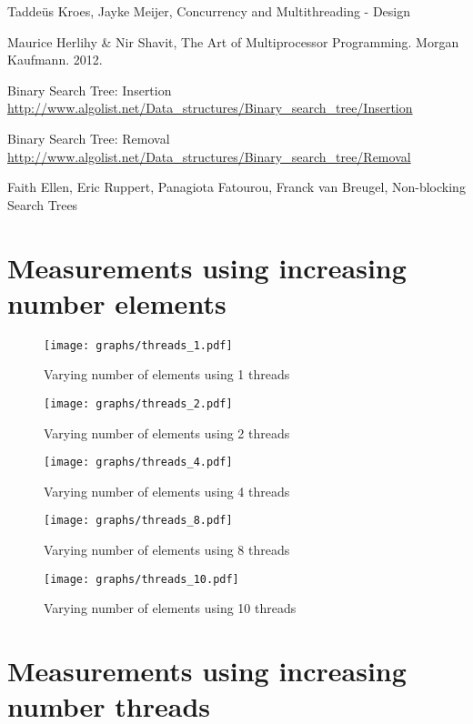\documentclass[a4paper]{article}
\begin{document}
\begin{thebibliography}{}
    Taddeüs Kroes, Jayke Meijer, Concurrency and Multithreading - Design

    Maurice Herlihy \& Nir Shavit, The Art of Multiprocessor Programming. Morgan Kaufmann.
    2012.

    Binary Search Tree: Insertion
    \url{http://www.algolist.net/Data_structures/Binary_search_tree/Insertion}

    Binary Search Tree: Removal
    \url{http://www.algolist.net/Data_structures/Binary_search_tree/Removal}

    Faith Ellen, Eric Ruppert, Panagiota Fatourou, Franck van Breugel, Non-blocking Search
    Trees

\appendix
\section{Measurements using increasing number elements}
\label{app:vary_nelements}

\begin{figure}[H]
    \texttt{[image: graphs/threads\_1.pdf]}
    \caption{Varying number of elements using 1 threads}
    \label{fig:threads_1}
\end{figure}
\begin{figure}[H]
    \texttt{[image: graphs/threads\_2.pdf]}
    \caption{Varying number of elements using 2 threads}
    \label{fig:threads_2}
\end{figure}
\begin{figure}[H]
    \texttt{[image: graphs/threads\_4.pdf]}
    \caption{Varying number of elements using 4 threads}
    \label{fig:threads_4}
\end{figure}
\begin{figure}[H]
    \texttt{[image: graphs/threads\_8.pdf]}
    \caption{Varying number of elements using 8 threads}
    \label{fig:threads_8}
\end{figure}
\begin{figure}[H]
    \texttt{[image: graphs/threads\_10.pdf]}
    \caption{Varying number of elements using 10 threads}
    \label{fig:threads_10}
\end{figure}

\pagebreak

\section{Measurements using increasing number threads}
\label{app:vary_nthreads}


\end{thebibliography}
\end{document}

